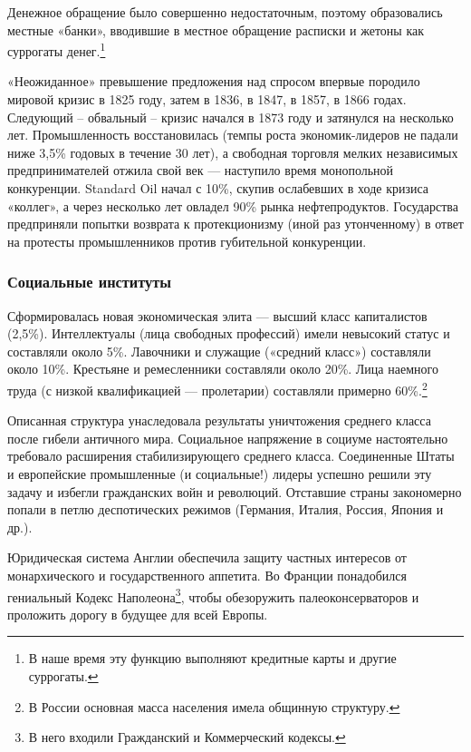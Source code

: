 Денежное обращение было совершенно недостаточным, поэтому образовались местные «банки», вводившие в местное обращение
расписки и жетоны как суррогаты денег.\footnote{В наше время эту функцию выполняют кредитные карты и
другие суррогаты.}


«Неожиданное» превышение предложения над спросом впервые породило мировой кризис в 1825 году, затем в 1836, в 1847, в
1857, в 1866 годах. Следующий – обвальный – кризис начался в 1873 году и затянулся на несколько лет. Промышленность
восстановилась (темпы роста экономик-лидеров не падали ниже 3,5\% годовых в течение 30 лет), а свободная торговля
мелких независимых предпринимателей отжила свой век — наступило время монопольной конкуренции.
\foreignlanguage{english}{Standard} \foreignlanguage{english}{Oil} начал с 10\%, скупив ослабевших в ходе кризиса
«коллег», а через несколько лет овладел 90\% рынка нефтепродуктов. Государства предприняли попытки возврата к
протекционизму (иной раз утонченному) в ответ на протесты промышленников против губительной конкуренции.

\subsubsection[Социальные институты ]{Социальные институты }

Сформировалась новая экономическая элита — высший класс капиталистов (2,5\%). Интеллектуалы (лица свободных профессий)
имели невысокий статус и составляли около 5\%. Лавочники и служащие («средний класс») составляли около 10\%. Крестьяне
и ремесленники составляли около 20\%. Лица наемного труда (с низкой квалификацией — пролетарии) составляли примерно
60\%.\footnote{В России основная масса населения имела общинную структуру.}


Описанная структура унаследовала результаты уничтожения среднего класса после гибели античного мира. Социальное
напряжение в социуме настоятельно требовало расширения стабилизирующего среднего класса. Соединенные Штаты и
европейские промышленные (и социальные!) лидеры успешно решили эту задачу и избегли гражданских войн и революций.
Отставшие страны закономерно попали в петлю деспотических режимов (Германия, Италия, Россия, Япония и др.).


Юридическая система Англии обеспечила защиту частных интересов от монархического и государственного аппетита. Во Франции
понадобился гениальный Кодекс Наполеона\footnote{В него входили Гражданский и Коммерческий кодексы.},
чтобы обезоружить палеоконсерваторов и проложить дорогу в будущее для всей Европы.


